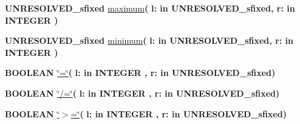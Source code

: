 \begin{DoxyCompactItemize}
\item 
{\bfseries {\bfseries \textcolor{vhdlchar}{U\+N\+R\+E\+S\+O\+L\+V\+E\+D\+\_\+sfixed}\textcolor{vhdlchar}{ }}} \hyperlink{class__fixed__pkg_a427ed4c94126ca4966f81712b325a314}{maximum}{\bfseries  ( }{\bfseries \textcolor{vhdlchar}{l\+: }\textcolor{stringliteral}{in }\textcolor{vhdlchar}{U\+N\+R\+E\+S\+O\+L\+V\+E\+D\+\_\+sfixed}}{\bfseries  , \textcolor{vhdlchar}{r\+: }\textcolor{stringliteral}{in }{\bfseries \textcolor{comment}{I\+N\+T\+E\+G\+E\+R}\textcolor{vhdlchar}{ }}}{\bfseries  )} 
\item 
{\bfseries {\bfseries \textcolor{vhdlchar}{U\+N\+R\+E\+S\+O\+L\+V\+E\+D\+\_\+sfixed}\textcolor{vhdlchar}{ }}} \hyperlink{class__fixed__pkg_ac6e7f426014fe929a97c17a175463b51}{minimum}{\bfseries  ( }{\bfseries \textcolor{vhdlchar}{l\+: }\textcolor{stringliteral}{in }\textcolor{vhdlchar}{U\+N\+R\+E\+S\+O\+L\+V\+E\+D\+\_\+sfixed}}{\bfseries  , \textcolor{vhdlchar}{r\+: }\textcolor{stringliteral}{in }{\bfseries \textcolor{comment}{I\+N\+T\+E\+G\+E\+R}\textcolor{vhdlchar}{ }}}{\bfseries  )} 
\item 
{\bfseries {\bfseries \textcolor{comment}{B\+O\+O\+L\+E\+A\+N}\textcolor{vhdlchar}{ }}} \hyperlink{class__fixed__pkg_a7949e9258ea0749e3b35961feea8db87}{\char`\"{}=\char`\"{}}{\bfseries  ( }{\bfseries \textcolor{vhdlchar}{l\+: }\textcolor{stringliteral}{in }{\bfseries \textcolor{comment}{I\+N\+T\+E\+G\+E\+R}\textcolor{vhdlchar}{ }}}{\bfseries  , \textcolor{vhdlchar}{r\+: }\textcolor{stringliteral}{in }\textcolor{vhdlchar}{U\+N\+R\+E\+S\+O\+L\+V\+E\+D\+\_\+sfixed}}{\bfseries  )} 
\item 
{\bfseries {\bfseries \textcolor{comment}{B\+O\+O\+L\+E\+A\+N}\textcolor{vhdlchar}{ }}} \hyperlink{class__fixed__pkg_a00087aded97b434060226b9ba63a9077}{\char`\"{}/=\char`\"{}}{\bfseries  ( }{\bfseries \textcolor{vhdlchar}{l\+: }\textcolor{stringliteral}{in }{\bfseries \textcolor{comment}{I\+N\+T\+E\+G\+E\+R}\textcolor{vhdlchar}{ }}}{\bfseries  , \textcolor{vhdlchar}{r\+: }\textcolor{stringliteral}{in }\textcolor{vhdlchar}{U\+N\+R\+E\+S\+O\+L\+V\+E\+D\+\_\+sfixed}}{\bfseries  )} 
\item 
{\bfseries {\bfseries \textcolor{comment}{B\+O\+O\+L\+E\+A\+N}\textcolor{vhdlchar}{ }}} \hyperlink{class__fixed__pkg_a4cd07e388cdbb3996dd11f56781d3758}{\char`\"{}$>$=\char`\"{}}{\bfseries  ( }{\bfseries \textcolor{vhdlchar}{l\+: }\textcolor{stringliteral}{in }{\bfseries \textcolor{comment}{I\+N\+T\+E\+G\+E\+R}\textcolor{vhdlchar}{ }}}{\bfseries  , \textcolor{vhdlchar}{r\+: }\textcolor{stringliteral}{in }\textcolor{vhdlchar}{U\+N\+R\+E\+S\+O\+L\+V\+E\+D\+\_\+sfixed}}{\bfseries  )} 

\end{DoxyCompactItemize}
